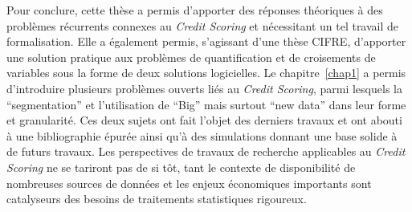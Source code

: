 \medskip

Pour conclure, cette thèse a permis d'apporter des réponses théoriques à des problèmes récurrents connexes au \textit{Credit Scoring} et nécessitant un tel travail de formalisation. Elle a également permis, s'agissant d'une thèse CIFRE, d'apporter une solution pratique aux problèmes de quantification et de croisements de variables sous la forme de deux solutions logicielles. Le chapitre~\ref{chap1} a permis d'introduire plusieurs problèmes ouverts liés au \textit{Credit Scoring}, parmi lesquels la ``segmentation'' et l'utilisation de ``Big'' mais surtout ``new data'' dans leur forme et granularité. Ces deux sujets ont fait l'objet des derniers travaux et ont abouti à une bibliographie épurée ainsi qu'à des simulations donnant une base solide à de futurs travaux. Les perspectives de travaux de recherche applicables au \textit{Credit Scoring} ne se tariront pas de si tôt, tant le contexte de disponibilité de nombreuses sources de données et les enjeux économiques importants sont catalyseurs des besoins de traitements statistiques rigoureux.

\printbibliography[heading=subbibliography, title=Références de la conclusion]